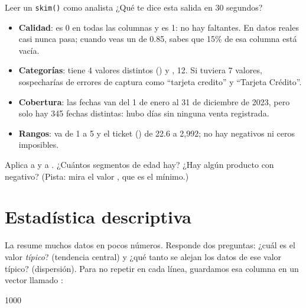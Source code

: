 \begin{ejemplo}{Leer un \texttt{skim()} como analista}
¿Qué te dice esta salida en 30 segundos?
\begin{itemize}
  \item \textbf{Calidad}:  es 0 en todas las columnas y
         es 1: no hay faltantes. En datos reales casi
        nunca pasa; cuando veas un  de 0.85, sabes que
        15\% de esa columna está vacía.
  \item \textbf{Categorías}:  tiene 4 valores distintos
        () y , 12. Si 
        tuviera 7 valores, sospecharías de errores de captura como
        ``tarjeta credito'' y ``Tarjeta Crédito''.
  \item \textbf{Cobertura}: las fechas van del 1 de enero al 31 de diciembre de
        2023, pero solo hay 345 fechas distintas: hubo días sin ninguna venta
        registrada.
  \item \textbf{Rangos}:  va de 1 a 5 y el ticket
        () de 22.6 a 2,992; no hay negativos ni
        ceros imposibles.
\end{itemize}
\end{ejemplo}

\begin{hazlotu}
Aplica  a  y a
. ¿Cuántos segmentos de edad hay? ¿Hay algún producto con
 negativo? (Pista: mira el valor , que es el
mínimo.)
\end{hazlotu}

\section{Estadística descriptiva}
\label{sec:m4-descriptiva}

La  resume muchos datos en pocos números.
Responde dos preguntas: ¿cuál es el valor \emph{típico}? (tendencia central)
y ¿qué tanto se alejan los datos de ese valor típico? (dispersión). Para no
repetir  en cada línea, guardamos
esa columna en un vector llamado :

\begin{rsalida}
[1] 1000
\end{rsalida}

